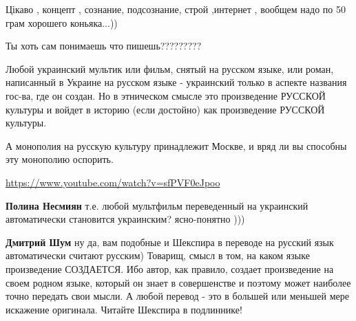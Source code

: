 \begin{itemize}
Цікаво , концепт , сознание, подсознание, строй ,интернет , вообщем надо по 50 грам хорошего коньяка...))

 
Ты хоть сам понимаешь что пишешь?????????

 

Любой украинский мультик или фильм, снятый на русском языке, или роман,
написанный в Украине на русском языке - украинский только в аспекте названия
гос-ва, где он создан. Но в этническом смысле это произведение РУССКОЙ культуры
и войдет в историю (если достойно) как произведение РУССКОЙ культуры.

А монополия на русскую культуру принадлежит Москве, и вряд ли вы способны эту
монополию оспорить.

\url{https://www.youtube.com/watch?v=sfPVF0eJpoo}

\begin{itemize}
 
\textbf{Полина Несмиян} т.е. любой мультфильм переведенный на украинский автоматически становится украинским? ясно-понятно )))

 
\textbf{Дмитрий Шум} ну да, вам подобные и Шекспира в переводе на русский язык
автоматически считают русским) Товарищ, смысл в том, на каком языке
произведение СОЗДАЕТСЯ. Ибо автор, как правило, создает произведение на своем
родном языке, который он знает в совершенстве и поэтому может наиболее точно
передать свои мысли. А любой перевод - это в большей или меньшей мере искажение
оригинала. Читайте Шекспира в подлиннике!


\end{itemize}
\end{itemize}
